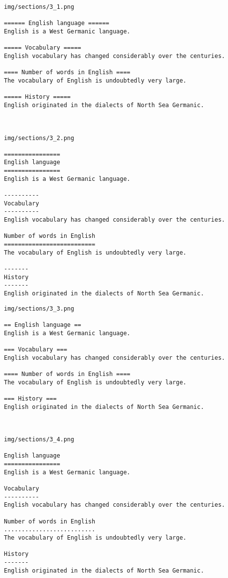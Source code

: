 \documentclass[14pt]{article}
\begin{document}
\newpage
\begin{verbatim}
img/sections/3_1.png

====== English language ======
English is a West Germanic language.

===== Vocabulary =====
English vocabulary has changed considerably over the centuries.

==== Number of words in English ====
The vocabulary of English is undoubtedly very large.

===== History =====
English originated in the dialects of North Sea Germanic.



img/sections/3_2.png

================
English language
================
English is a West Germanic language.

----------
Vocabulary
----------
English vocabulary has changed considerably over the centuries.

Number of words in English
==========================
The vocabulary of English is undoubtedly very large.

-------
History
-------
English originated in the dialects of North Sea Germanic.

\end{verbatim}
\newpage
\begin{verbatim}
img/sections/3_3.png

== English language ==
English is a West Germanic language.

=== Vocabulary ===
English vocabulary has changed considerably over the centuries.

==== Number of words in English ====
The vocabulary of English is undoubtedly very large.

=== History ===
English originated in the dialects of North Sea Germanic.



img/sections/3_4.png

English language
================
English is a West Germanic language.

Vocabulary
----------
English vocabulary has changed considerably over the centuries.

Number of words in English
..........................
The vocabulary of English is undoubtedly very large.

History
-------
English originated in the dialects of North Sea Germanic.


\end{verbatim}
\end{document}
